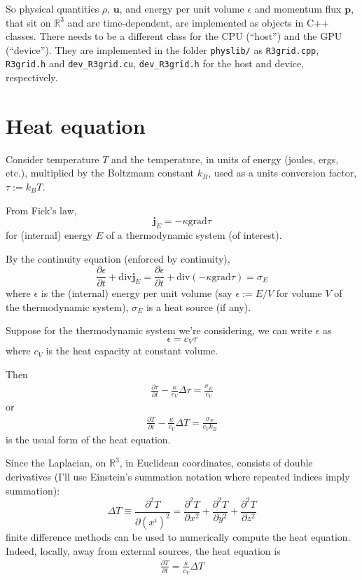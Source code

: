 \documentclass[10pt]{amsart}
\begin{document}
So physical quantities $\rho$, $\mathbf{u}$, and energy per unit volume $\epsilon$ and momentum flux $\mathbf{p}$, that sit on $\mathbb{R}^3$ and are time-dependent, are implemented as objects in C++ classes.  There needs to be a different class for the CPU (``host'') and the GPU (``device'').  They are implemented in the folder \verb|physlib/| as \verb|R3grid.cpp|, \verb|R3grid.h| and \verb|dev_R3grid.cu|, \verb|dev_R3grid.h| for the host and device, respectively.  

\section{Heat equation}

Consider temperature $T$ and the temperature, in units of energy (joules, ergs, etc.), multiplied by the Boltzmann constant $k_B$, used as a units conversion factor, $\tau := k_BT$.

From Fick's law,
\[
\mathbf{j}_E = -\kappa \text{grad} \tau
\]
for (internal) energy $E$ of a thermodynamic system (of interest).

By the continuity equation (enforced by continuity),
\[
\frac{ \partial \epsilon }{ \partial t} + \text{div}\mathbf{j}_E = \frac{ \partial \epsilon }{ \partial t} + \text{div}(-\kappa \text{grad}\tau ) = \sigma_E
\]
where $\epsilon$ is the (internal) energy per unit volume (say $\epsilon := E /V$ for volume $V$ of the thermodynamic system), $\sigma_E$ is a heat source (if any).

Suppose for the thermodynamic system we're considering, we can write $\epsilon$ as
\[
\epsilon = c_V \tau
\]
where $c_V$ is the heat capacity at constant volume.

Then
\[
\begin{gathered}
\frac{ \partial \tau }{ \partial t} - \frac{ \kappa}{c_V} \Delta \tau = \frac{ \sigma_E }{ c_V} 
\end{gathered}
\]
or
\[
\begin{gathered}
\frac{ \partial T }{ \partial t} - \frac{ \kappa}{c_V} \Delta T = \frac{ \sigma_E }{ c_V k_B} 
\end{gathered}
\]
is the usual form of the heat equation.

Since the Laplacian, on $\mathbb{R}^3$, in Euclidean coordinates, consists of double derivatives (I'll use Einstein's summation notation where repeated indices imply summation):
\[
\Delta T \equiv \frac{ \partial^2 T}{ \partial (x^i)^2 } = \frac{ \partial ^2 T}{ \partial x^2 } + \frac{ \partial ^2 T}{ \partial y^2 } + \frac{ \partial ^2 T}{ \partial z^2 }
\]
finite difference methods can be used to numerically compute the heat equation.  Indeed, locally, away from external sources, the heat equation is
\[
\begin{gathered}
\frac{ \partial T }{ \partial t} =  \frac{ \kappa}{c_V} \Delta T   
\end{gathered}
\]
\end{document}
